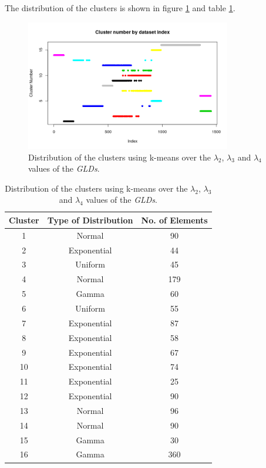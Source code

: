 The distribution of the clusters is shown in figure \ref{fig:dataset2_l2l3l4} and table \ref{tab:dataset2_l2l3l4}.

\begin{figure}[H]
    \centering
    \includegraphics[width=0.8\textwidth]{img/gld_clustering/Dataset2/nuevo/clusters_by_index.png}
    \caption{Distribution of the clusters using k-means over the $\lambda_{2}$, $\lambda_{3}$ and $\lambda_{4}$ values of the \textit{GLDs}.}
    \label{fig:dataset2_l2l3l4}
\end{figure}

\begin{table}[]
\centering
\caption{Distribution of the clusters using k-means over the $\lambda_{2}$, $\lambda_{3}$ and $\lambda_{4}$ values of the \textit{GLDs}.}
\label{tab:dataset2_l2l3l4}
\begin{tabular}{|c|c|c|}
\hline
Cluster & Type of Distribution & No. of Elements \\ \hline
1       & Normal          & 90              \\ \hline
2       & Exponential          & 44              \\ \hline
3       & Uniform          & 45             \\ \hline
4       & Normal               & 179              \\ \hline
5       & Gamma               & 60             \\ \hline
6       & Uniform               & 55            \\ \hline
7       & Exponential              & 87            \\ \hline
8       & Exponential          & 58              \\ \hline
9       & Exponential          & 67               \\ \hline
10      & Exponential               & 74              \\ \hline
11      & Exponential          & 25              \\ \hline
12       & Exponential              & 90             \\ \hline
13       & Normal          & 96              \\ \hline
14       & Normal          & 90              \\ \hline
15      & Gamma               & 30              \\ \hline
16      & Gamma          & 360              \\ \hline
\end{tabular}
\end{table}

